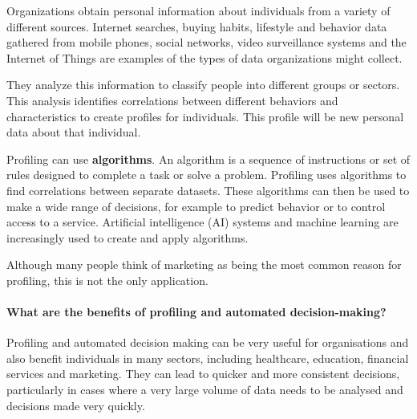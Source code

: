 Organizations obtain personal information about individuals from a variety of different sources. Internet searches, buying habits, lifestyle and behavior data gathered from mobile phones, social networks, video surveillance systems and the Internet of Things are examples of the types of data organizations might collect.

They analyze this information to classify people into different groups or sectors. This analysis identifies correlations between different behaviors and characteristics to create profiles for individuals. This profile will be new personal data about that individual.


Profiling can use \textbf{algorithms}. An algorithm is a sequence of instructions or set of rules designed to complete a task or solve a problem. Profiling uses algorithms to find correlations between separate datasets. These algorithms can then be used to make a wide range of decisions, for example to predict behavior or to control access to a service. Artificial intelligence (AI) systems and machine learning are increasingly used to create and apply algorithms. 

Although many people think of marketing as being the most common reason for profiling, this is not the only application.


\paragraph{What are the benefits of profiling and automated decision-making?}
Profiling and automated decision making can be very useful for organisations and also benefit individuals in many sectors, including healthcare, education, financial services and marketing. They can lead to quicker and more consistent decisions, particularly in cases where a very large volume of data needs to be analysed and decisions made very quickly.      


